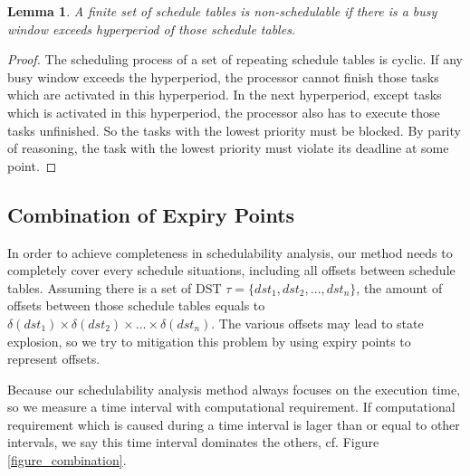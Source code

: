 \documentclass[10pt,conference]{IEEEtran}
\newtheorem{lemma}{Lemma}
\begin{document}
\begin{lemma}
  A finite set of schedule tables is non-schedulable if there is a busy window exceeds hyperperiod of those schedule tables.
\end{lemma}\label{lemma_hyperperiod}
\begin{proof}
  The scheduling process of a set of repeating schedule tables is cyclic. If any busy window exceeds the hyperperiod, the processor cannot finish those tasks which are activated in this hyperperiod. In the next hyperperiod, except tasks which is activated in this hyperperiod, the processor also has to execute those tasks unfinished. So the tasks with the lowest priority must be blocked. By parity of reasoning, the task with the lowest priority must violate its deadline at some point.
\end{proof}
\subsection{Combination of Expiry Points}\label{section_combination}
In order to achieve completeness in schedulability analysis, our method needs to completely cover every schedule situations, including all offsets between schedule tables. Assuming there is a set of DST $\tau=\{dst_1,dst_2,\dots,dst_n\}$, the amount of offsets between those schedule tables equals to $\delta(dst_1)\times\delta(dst_2)\times\dots\times\delta(dst_n)$. The various offsets may lead to state explosion, so we try to mitigation this problem by using expiry points to represent offsets.

Because our schedulability analysis method always focuses on the execution time, so we measure a time interval with computational requirement. If computational requirement which is caused during a time interval is lager than or equal to other intervals, we say this time interval dominates the others, cf. Figure \ref{figure_combination}.
\end{document}

